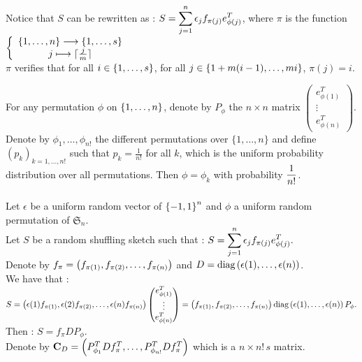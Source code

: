 \begin{itemize}
 
 
Notice that $S$ can be rewritten as : $S = \displaystyle\sum_{j=1}^{n} \epsilon_{j}f_{\pi(j)}e_{\phi(j)}^{T} $, where $\pi$ is the function $\left\{\begin{array}{c}\left\{1,\dots,n\right\}\longrightarrow \left\{1,\dots,s\right\}\\ j \longmapsto \lceil\frac{j}{m} \rceil\end{array}\right.$\\
 
 $\pi$ verifies that for all $i \in \left\{1,\dots,s\right\}$, for all $j \in \left\{1+m (i-1),\dots,m i\right\}$, $\pi(j) = i. $
 
 For any permutation $\phi$ on $\left\{1,\dots,n\right\}$, denote by $P_{\phi}$ the $n\times n$ matrix $ \begin{pmatrix} e_{\phi(1)}^{T} \\ \vdots \\ e_{\phi(n)}^{T} \end{pmatrix} $.\\
 Denote by $\phi_{1},\dots,\phi_{n!}$ the different permutations over $\{1,\ldots, n\}$ and define $(p_{k})_{k=1,\dots,n!}$ such that $p_{k} = \frac{1}{n!}$ for all $k$, which is the uniform probability distribution over all permutations.  Then $\phi = \phi_{k}$ with probability $\displaystyle \frac{1}{n!}$.\\\\
 
 Let $\epsilon$ be a uniform random vector of $\left\{-1,1\right\}^{n}$ and $\phi$ a uniform random permutation of $\mathfrak{S}_{n}$.\\
Let $S$ be a random shuffling sketch such that : $S = \displaystyle\sum_{j=1}^{n} \epsilon_{j}f_{\pi(j)}e_{\phi(j)}^{T} .$\\

Denote by $f_{\pi} = \left( f_{\pi(1)}, f_{\pi(2)},\dots, f_{\pi(n)} \right)$ and $D = \text{diag}\left(\epsilon(1),\dots,\epsilon(n)\right)$.\\
We have that :\\
$S = \left( \epsilon(1)f_{\pi(1)},\epsilon(2)f_{\pi(2)},\dots,\epsilon(n)f_{\pi(n)} \right) \begin{pmatrix} e_{\phi(1)}^{T} \\ \vdots \\ e_{\phi(n)}^{T} \end{pmatrix} = \left( f_{\pi(1)}, f_{\pi(2)},\dots, f_{\pi(n)} \right) \text{diag}\left(\epsilon(1),\dots,\epsilon(n)\right) P_{\phi}.$\\
Then : $S = f_{\pi} D P_{\phi}$.\\

Denote by $\bold{C}_{D} = \left(P_{\phi_{1}}^{T} D f_{\pi}^{T},\dots,P_{\phi_{n!}}^{T} D f_{\pi}^{T} \right) $ which is a $ n \times n! \,s$ matrix.\\



\end{itemize}
